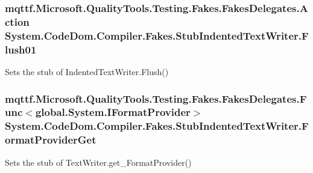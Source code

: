 \hypertarget{class_system_1_1_code_dom_1_1_compiler_1_1_fakes_1_1_stub_indented_text_writer_ab9f60f577f93486430ab76b2f8dde6cd}{
\subsubsection[{Flush01}]{\setlength{\rightskip}{0pt plus 5cm}mqttf.\-Microsoft.\-Quality\-Tools.\-Testing.\-Fakes.\-Fakes\-Delegates.\-Action System.\-Code\-Dom.\-Compiler.\-Fakes.\-Stub\-Indented\-Text\-Writer.\-Flush01}}\label{class_system_1_1_code_dom_1_1_compiler_1_1_fakes_1_1_stub_indented_text_writer_ab9f60f577f93486430ab76b2f8dde6cd}


Sets the stub of Indented\-Text\-Writer.\-Flush()

\hypertarget{class_system_1_1_code_dom_1_1_compiler_1_1_fakes_1_1_stub_indented_text_writer_abbf91630d7b8b647d9b36bdc102224a0}{
\subsubsection[{Format\-Provider\-Get}]{\setlength{\rightskip}{0pt plus 5cm}mqttf.\-Microsoft.\-Quality\-Tools.\-Testing.\-Fakes.\-Fakes\-Delegates.\-Func$<$global.\-System.\-I\-Format\-Provider$>$ System.\-Code\-Dom.\-Compiler.\-Fakes.\-Stub\-Indented\-Text\-Writer.\-Format\-Provider\-Get}}\label{class_system_1_1_code_dom_1_1_compiler_1_1_fakes_1_1_stub_indented_text_writer_abbf91630d7b8b647d9b36bdc102224a0}


Sets the stub of Text\-Writer.\-get\-\_\-\-Format\-Provider()

